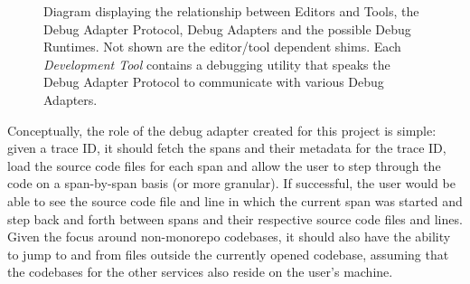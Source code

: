 \documentclass[12pt,pdftex,titlepage]{report}
\begin{document}
                \begin{figure}[hbt!]
                    \centering
                    \caption{Diagram displaying the relationship between Editors and Tools, the Debug Adapter Protocol, Debug Adapters and the possible Debug Runtimes. Not shown are the
                        editor/tool dependent shims. Each \textit{Development Tool} contains a debugging utility that speaks the Debug Adapter Protocol to communicate with various Debug
                        Adapters.}
                    \label{fig:debug-arch}
                \end{figure}

                Conceptually, the role of the debug adapter created for this project is simple: given a trace ID, it should fetch the spans and their metadata for the trace ID, load the 
                source code files for each span and allow the user to step through the code on a span-by-span basis (or more granular). If successful, the user would be able to see the
                source code file and line in which the current span was started and step back and forth between spans and their respective source code files and lines. Given the focus
                around non-monorepo codebases, it should also have the ability to jump to and from files outside the currently opened codebase, assuming that the codebases for the other 
                services also reside on the user's machine.
                
\end{document}
